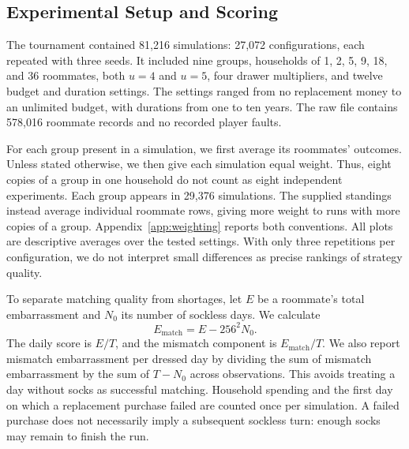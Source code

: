 \subsection{Experimental Setup and Scoring}

The tournament contained 81,216 simulations: 27,072 configurations, each repeated with three seeds. It included nine groups, households of 1, 2, 5, 9, 18, and 36 roommates, both \(u=4\) and \(u=5\), four drawer multipliers, and twelve budget and duration settings. The settings ranged from no replacement money to an unlimited budget, with durations from one to ten years. The raw file contains 578,016 roommate records and no recorded player faults.  

For each group present in a simulation, we first average its roommates' outcomes. Unless stated otherwise, we then give each simulation equal weight. Thus, eight copies of a group in one household do not count as eight independent experiments. Each group appears in 29,376 simulations. The supplied standings instead average individual roommate rows, giving more weight to runs with more copies of a group. Appendix~\ref{app:weighting} reports both conventions. All plots are descriptive averages over the tested settings. With only three repetitions per configuration, we do not interpret small differences as precise rankings of strategy quality.

To separate matching quality from shortages, let \(E\) be a roommate's total embarrassment and \(N_0\) its number of sockless days. We calculate
\[
E_{\mathrm{match}}=E-256^2N_0.
\]
The daily score is \(E/T\), and the mismatch component is \(E_{\mathrm{match}}/T\). We also report mismatch embarrassment per dressed day by dividing the sum of mismatch embarrassment by the sum of \(T-N_0\) across observations. This avoids treating a day without socks as successful matching. Household spending and the first day on which a replacement purchase failed are counted once per simulation. A failed purchase does not necessarily imply a subsequent sockless turn: enough socks may remain to finish the run.


